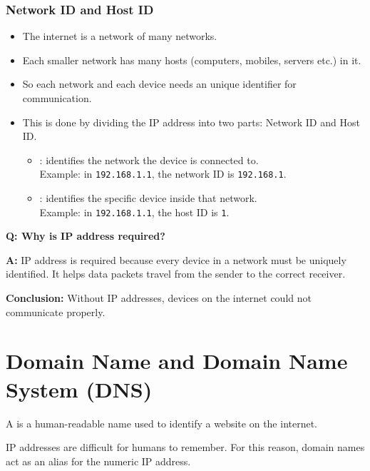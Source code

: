 \subsubsection{Network ID and Host ID}
\begin{itemize}
    \item The internet is a network of many networks.
    \item Each smaller network has many hosts (computers, mobiles, servers etc.) in it.
    \item So each network and each device needs an unique identifier for communication.
    \item This is done by dividing the IP address into two parts: Network ID and Host ID.
        \begin{itemize}
            \item {}: identifies the network the device is connected to. \\
            Example: in \texttt{192.168.1.1}, the network ID is \texttt{192.168.1}.
            \item {}: identifies the specific device inside that network. \\
            Example: in \texttt{192.168.1.1}, the host ID is \texttt{1}.
        \end{itemize}
\end{itemize}

\begin{questionanswerbox}
\textbf{Q: Why is IP address required?}

\medskip
\textbf{A:}  
IP address is required because every device in a network must be uniquely identified. It helps data packets travel from the sender to the correct receiver.

\medskip
\textbf{Conclusion:}  
Without IP addresses, devices on the internet could not communicate properly.
\end{questionanswerbox}


\section{Domain Name and Domain Name System (DNS)}

\begin{definitionbox}
    A  is a human-readable name used to identify a website on the internet.
\end{definitionbox}

\Note IP addresses are difficult for humans to remember. For this reason, domain names act as an alias for the numeric IP address.

